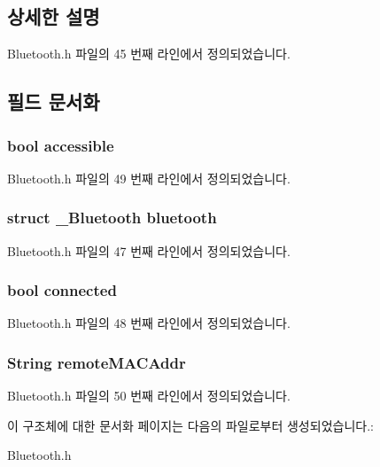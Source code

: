 \subsection{상세한 설명}


Bluetooth.\-h 파일의 45 번째 라인에서 정의되었습니다.



\subsection{필드 문서화}
\hypertarget{struct_bluetooth_extends_a348a5a495aba2753e3e5e5d013f1c612}{
\subsubsection[{accessible}]{\setlength{\rightskip}{0pt plus 5cm}bool accessible}}\label{struct_bluetooth_extends_a348a5a495aba2753e3e5e5d013f1c612}


Bluetooth.\-h 파일의 49 번째 라인에서 정의되었습니다.

\hypertarget{struct_bluetooth_extends_afe4e56b7ac932d03957e2c38f209f55c}{
\subsubsection[{bluetooth}]{\setlength{\rightskip}{0pt plus 5cm}struct {\bf \-\_\-\-Bluetooth} bluetooth}}\label{struct_bluetooth_extends_afe4e56b7ac932d03957e2c38f209f55c}


Bluetooth.\-h 파일의 47 번째 라인에서 정의되었습니다.

\hypertarget{struct_bluetooth_extends_ab36823025f12a809217f7771125658c2}{
\subsubsection[{connected}]{\setlength{\rightskip}{0pt plus 5cm}bool connected}}\label{struct_bluetooth_extends_ab36823025f12a809217f7771125658c2}


Bluetooth.\-h 파일의 48 번째 라인에서 정의되었습니다.

\hypertarget{struct_bluetooth_extends_a473f43fc5e8e19c1221c16e6fac3cb63}{
\subsubsection[{remote\-M\-A\-C\-Addr}]{\setlength{\rightskip}{0pt plus 5cm}String remote\-M\-A\-C\-Addr}}\label{struct_bluetooth_extends_a473f43fc5e8e19c1221c16e6fac3cb63}


Bluetooth.\-h 파일의 50 번째 라인에서 정의되었습니다.



이 구조체에 대한 문서화 페이지는 다음의 파일로부터 생성되었습니다.\-:\begin{DoxyCompactItemize}
\item 
Bluetooth.\-h\end{DoxyCompactItemize}
